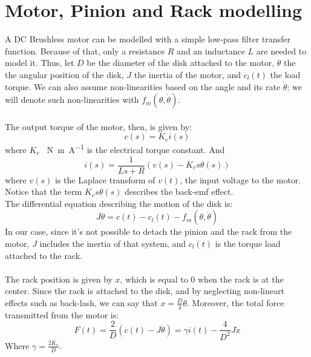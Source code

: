 \section{Motor, Pinion and Rack modelling} 
A DC Brushless motor can be modelled with a simple low-pass filter transfer function. Because of that, only a resistance $R$ and an inductance $L$ are needed to model it. Thus, let $D$ be the diameter of the disk attached to the motor, $\theta$ the the angular position of the disk, $J$ the inertia of the motor, and $c_{l}(t)$ the load torque. We can also assume non-linearities based on the angle and its rate $\dot{\theta}$:  we will denote such non-linearities with $f_{m}(\theta,\dot{\theta})$.\\ \\
 The output torque of the motor, then, is  given by:
 \begin{equation}
 c(s) = K_e i(s)
 \end{equation}
 where $K_e$ \SI{}{\newton \metre \per \ampere} is the electrical torque constant.
And
\begin{equation}
i(s)=\frac{1}{Ls+R} (v(s)-K_{e}s \theta(s))
\end{equation}
where $v(s)$ is the Laplace transform of $v(t)$, the input voltage to the motor. Notice that the term $K_{e}s \theta(s)$ describes the back-emf effect. \\
The differential equation describing the motion of the disk is:
$$J\ddot{\theta}=c(t)-c_{l}(t) -f_{m}(\theta,\dot{\theta})$$
In our case, since it's not possible to detach the pinion and the rack from the motor, $J$ includes the inertia of that system, and $c_{l}(t)$ is the torque load attached to the rack. 
\\ \\
The rack position is given by $x$, which is equal to $0$ when the rack is at the center. Since the rack is attached to the disk, and by neglecting non-lineart effects such as back-lash, we can say that $x=\frac{D}{2}\theta $. Moreover,  the total force transmitted from the motor is:
$$F(t)  =  \frac{2}{D} (c(t)-J\ddot{\theta}) = \gamma i(t) - \frac{4}{D^2}J \ddot{x}$$
Where $\gamma = \frac{2K_e}{D}$. 

